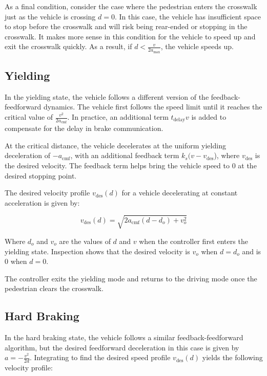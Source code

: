 \documentclass[letterpaper, 10 pt, conference]{ieeeconf} %
\begin{document}
As a final condition, consider the case where the pedestrian enters the crosswalk just as the vehicle is crossing $d = 0$. In this case, the vehicle has insufficient space to stop before the crosswalk and will risk being rear-ended or stopping in the crosswalk. It makes more sense in this condition for the vehicle to speed up and exit the crosswalk quickly. As a result, if $d < \frac{v}{2a_\mathrm{max}}$, the vehicle speeds up. 

\subsection{Yielding}

In the yielding state, the vehicle follows a different version of the feedback-feedforward dynamics. The vehicle first follows the speed limit until it reaches the critical value of $\frac{v^2}{2a_\mathrm{cmf}}$. In practice, an additional term $t_\mathrm{delay}v$ is added to compensate for the delay in brake communication. 

At the critical distance, the vehicle decelerates at the uniform yielding deceleration of $-a_\mathrm{cmf}$, with an additional feedback term $k_s(v - v_\mathrm{des}$), where $v_\mathrm{des}$ is the desired velocity. The feedback term helps bring the vehicle speed to 0 at the desired stopping point. 

The desired velocity profile $v_\mathrm{des}(d)$ for a vehicle decelerating at constant acceleration is given by: 

\begin{equation}
v_\mathrm{des}(d) = \sqrt{2a_\mathrm{cmf}(d-d_o) + v_o^2}
\end{equation}

Where $d_o$ and $v_o$ are the values of $d$ and $v$ when the controller first enters the yielding state. Inspection shows that the desired velocity is $v_o$ when $d = d_o$ and is 0 when $d = 0$. 

The controller exits the yielding mode and returns to the driving mode once the pedestrian clears the crosswalk. 

\subsection{Hard Braking}

In the hard braking state, the vehicle follows a similar feedback-feedforward algorithm, but the desired feedforward deceleration in this case is given by $a = -\frac{v^2}{2d}$. Integrating to find the desired speed profile $v_\mathrm{des}(d)$ yields the following velocity profile: 
\end{document}
